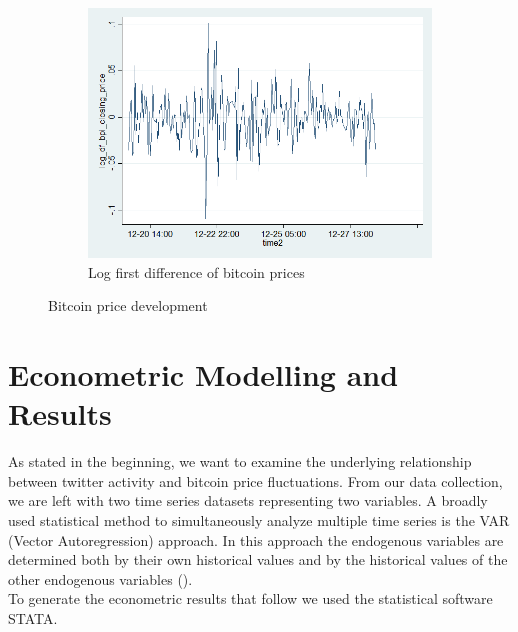 \documentclass[a4paper,american,12pt]{article}
\begin{document}
\begin{spacing}{1.2}
\begin{figure}[H]
\begin{subfigure}{.3\textwidth}
	\includegraphics[width=1.12\textwidth]{stata_export_graphs/graph_plot_log_df_bpi.png}
	\caption{Log first difference of bitcoin prices}
	\end{subfigure}
\caption{Bitcoin price development}
\end{figure}
	
\clearpage

\section{Econometric Modelling and Results}
\label{sec:EconometricModellingandResults}
As stated in the beginning, we want to examine the underlying relationship between twitter activity and bitcoin price fluctuations. From our data collection, we are left with two time series datasets representing two variables. A broadly used statistical method to simultaneously analyze multiple time series is the VAR (Vector Autoregression) approach. In this approach the endogenous variables are determined both by their own historical values and by the historical values of the other endogenous variables (\cite[pp.~4--5]{lütkepohl2007new}).\\
To generate the econometric results that follow we used the statistical software STATA.


\end{spacing}
\end{document}
